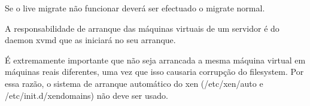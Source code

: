 Se o live migrate não funcionar deverá ser efectuado o migrate normal.

A responsabilidade de arranque das máquinas virtuais de um servidor é do daemon xvmd que as iniciará no seu arranque.

É extremamente importante que não seja arrancada a mesma máquina virtual em
máquinas reais diferentes, uma vez que isso causaria corrupção do filesystem.
Por essa razão, o sistema de arranque automático do xen (/etc/xen/auto e
/etc/init.d/xendomains) não deve ser usado.

